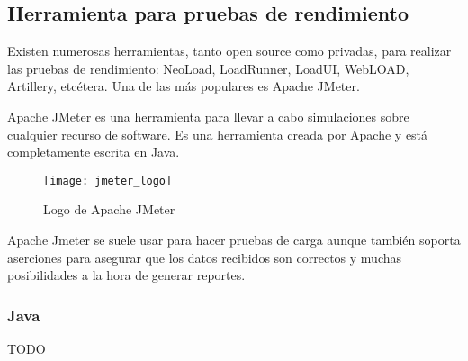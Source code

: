 \subsection{Herramienta para pruebas de rendimiento}

Existen numerosas herramientas, tanto open source como privadas, para realizar las pruebas de rendimiento: NeoLoad, LoadRunner, LoadUI, WebLOAD, Artillery, etcétera. Una de las más populares es Apache JMeter.

Apache JMeter es una herramienta para llevar a cabo simulaciones sobre cualquier recurso de software. Es una herramienta creada por Apache y está completamente escrita en Java.

\begin{figure}[htp!]
  \centering
  \texttt{[image: jmeter\_logo]}
  \caption{Logo de Apache JMeter}
  \label{fig:jmeter_logo}
\end{figure}

Apache Jmeter se suele usar para hacer pruebas de carga aunque también soporta aserciones para asegurar que los datos recibidos son correctos y muchas posibilidades a la hora de generar reportes.

\subsubsection{Java}

TODO
